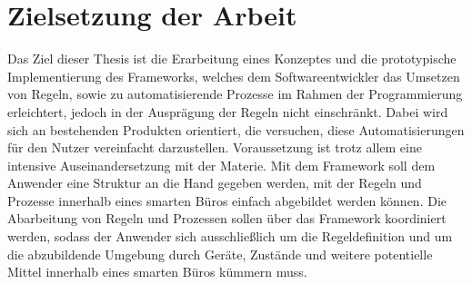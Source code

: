 \section{Zielsetzung der Arbeit}
\label{sec:zielsetzung}
    Das Ziel dieser Thesis ist die Erarbeitung eines Konzeptes und die prototypische Implementierung des Frameworks, welches dem Softwareentwickler das 
    Umsetzen von Regeln, sowie zu automatisierende Prozesse im Rahmen der Programmierung erleichtert, jedoch in der Ausprägung 
    der Regeln nicht einschränkt. Dabei wird sich an bestehenden Produkten orientiert, die versuchen, diese 
    Automatisierungen für den Nutzer vereinfacht darzustellen. Voraussetzung ist trotz allem eine intensive Auseinandersetzung mit der Materie. 
    Mit dem Framework soll dem Anwender eine Struktur an die Hand gegeben werden, mit der Regeln und Prozesse innerhalb eines 
    smarten Büros einfach abgebildet werden können. Die Abarbeitung von Regeln und Prozessen sollen über das Framework 
    koordiniert werden, sodass der Anwender sich ausschließlich um die Regeldefinition und um die abzubildende Umgebung durch Geräte, Zustände und weitere 
    potentielle Mittel innerhalb eines smarten Büros kümmern muss. 





